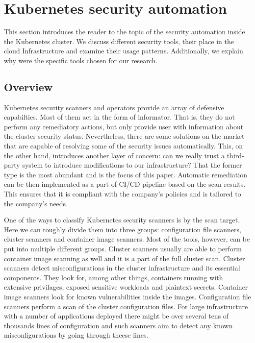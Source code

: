 \section{Kubernetes security automation}
\label{sec:kubernetes-security-automation}

This section introduces the reader to the topic of the security automation inside the Kubernetes cluster. We discuss different security tools, their place in the cloud Infrastructure and examine their usage patterns. Additionally, we explain why were the specific tools chosen for our research.

\subsection{Overview}

Kubernetes security scanners and operators provide an array of defensive capabilties. Most of them act in the form of informator. That is, they do not perform any remediatory actions, but only provide user with information about the cluster security status. Nevertheless, there are some solutions on the market that are capable of resolving some of the security issues automatically. This, on the other hand, introduces another layer of concern: can we really trust a third-party system to introduce modifications to our infrastructure? That the former type is the most abundant and is the focus of this paper. Automatic remediation can be then implemented as a part of CI/CD pipeline based on the scan results. This ensures that it is compliant with the company's policies and is tailored to the company's needs.

One of the ways to classify Kubernetes security scanners is by the scan target. Here we can roughly divide them into three groups: configuration file scanners, cluster scanners and container image scanners. Most of the tools, however, can be put into multiple different groups. Cluster scanners usually are able to perform container image scanning as well and it is a part of the full cluster scan. Cluster scanners detect misconfigurations in the cluster infrastructure and its essential components. They look for, among other things, containers running with extensive privilages, exposed sensitive workloads and plaintext secrets. Container image scanners look for known vulnerabilities inside the images. Configuration file scanners perform a scan of the cluster configuration files. For large infrastructure with a number of applications deployed there might be over several tens of thousands lines of configuration and such scanners aim to detect any known misconfigurations by going through theese lines.

